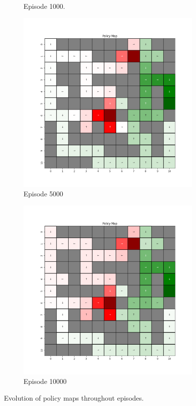 \documentclass{assignment}
\begin{document}
\begin{figure}[H]
\begin{subfigure}{0.3\textwidth}
    \caption{Episode 1000.}
    \end{subfigure}\hfill
    \begin{subfigure}{0.3\textwidth}
        \includegraphics[width=\textwidth]{figures/policy_td/default/policy_alpha_0.1_gamma_0.95_epsilon_0.2_iteration_5000.png}
    \caption{Episode 5000}
    \end{subfigure}\hfill
    \begin{subfigure}{0.3\textwidth}
        \includegraphics[width=\textwidth]{figures/policy_td/default/policy_alpha_0.1_gamma_0.95_epsilon_0.2_iteration_10000.png}
    \caption{Episode 10000}
    \end{subfigure}
    \caption{Evolution of policy maps throughout episodes.}
    \label{fig:default_td_learning_policy}
\end{figure}
\end{document}
